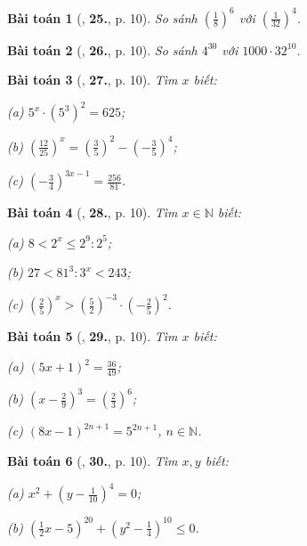\documentclass{article}
\numberwithin{equation}{section}
\newtheorem{baitoan}{Bài toán}[section]
\begin{document}
\begin{baitoan}[\cite{Tuyen_Toan_7}, \textbf{25.}, p. 10]
	So sánh $\left(\frac{1}{8}\right)^6$ với $\left(\frac{1}{32}\right)^4$.
\end{baitoan}

\begin{baitoan}[\cite{Tuyen_Toan_7}, \textbf{26.}, p. 10]
	So sánh $4^{30}$ với $1000\cdot 32^{10}$.
\end{baitoan}

\begin{baitoan}[\cite{Tuyen_Toan_7}, \textbf{27.}, p. 10]
	Tìm $x$ biết:
	\begin{enumerate*}
		\item[(a)] $5^x\cdot(5^3)^2 = 625$;
		\item[(b)] $\left(\frac{12}{25}\right)^x = \left(\frac{3}{5}\right)^2 - \left(-\frac{3}{5}\right)^4$;
		\item[(c)] $\left(-\frac{3}{4}\right)^{3x - 1} = \frac{256}{81}$.
	\end{enumerate*}
\end{baitoan}

\begin{baitoan}[\cite{Tuyen_Toan_7}, \textbf{28.}, p. 10]
	Tìm $x\in\mathbb{N}$ biết:
	\begin{enumerate*}
		\item[(a)] $8 < 2^x\le 2^9:2^5$;
		\item[(b)] $27 < 81^3:3^x < 243$;
		\item[(c)] $\left(\frac{2}{5}\right)^x > \left(\frac{5}{2}\right)^{-3}\cdot\left(-\frac{2}{5}\right)^2$.
	\end{enumerate*}
\end{baitoan}

\begin{baitoan}[\cite{Tuyen_Toan_7}, \textbf{29.}, p. 10]
	Tìm $x$ biết:
	\begin{enumerate*}
		\item[(a)] $(5x + 1)^2 = \frac{36}{49}$;
		\item[(b)] $\left(x - \frac{2}{9}\right)^3 = \left(\frac{2}{3}\right)^6$;
		\item[(c)] $(8x - 1)^{2n + 1} = 5^{2n + 1}$, $n\in\mathbb{N}$.
	\end{enumerate*}
\end{baitoan}

\begin{baitoan}[\cite{Tuyen_Toan_7}, \textbf{30.}, p. 10]
	 Tìm $x,y$ biết:
	 \begin{enumerate*}
	 	\item[(a)] $x^2 + \left(y - \frac{1}{10}\right)^4 = 0$;
	 	\item[(b)] $\left(\frac{1}{2}x - 5\right)^{20} + \left(y^2 - \frac{1}{4}\right)^{10}\le 0$.
	\end{enumerate*}
\end{baitoan}
\end{document}
